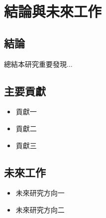 
\chapter{結論與未來工作}

\section{結論}

總結本研究重要發現...

\section{主要貢獻}

\begin{itemize}
    \item 貢獻一
    \item 貢獻二
    \item 貢獻三
\end{itemize}

\section{未來工作}

\begin{itemize}
    \item 未來研究方向一
    \item 未來研究方向二
\end{itemize}
